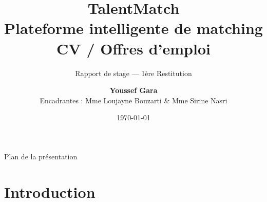 \documentclass[aspectratio=169]{beamer}
\title[TalentMatch — 1\`ere Restitution]{%
  \textbf{TalentMatch}\\
  \large Plateforme intelligente de matching CV / Offres d'emploi}
\subtitle{Rapport de stage — 1\`ere Restitution}
\author[Youssef Gara]{%
  \textbf{Youssef Gara}\\[4pt]
  {\small Encadrantes : Mme Loujayne Bouzarti \& Mme Sirine Nasri}}
\institute[3S]{%
  \textbf{3S}\\
  Stage du \textbf{Février 2026} au \textbf{Août 2026}}
\date{\today}
\begin{document}

\begin{frame}
  \titlepage
\end{frame}

\begin{frame}{Plan de la présentation}
  \tableofcontents[hideallsubsections]
\end{frame}

\section{Introduction}
\end{document}
